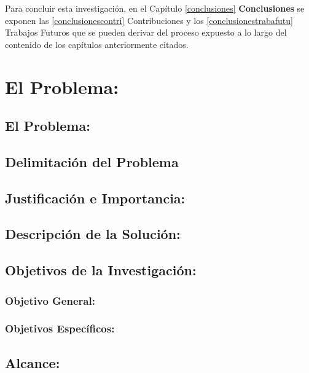 \documentclass[
  10,
  openany]{book}
\begin{document}
Para concluir esta investigación, en el Capítulo \ref{conclusiones} \textbf{Conclusiones} se exponen las \ref{conclusionescontri} Contribuciones y los \ref{conclusionestrabafutu} Trabajos Futuros que se pueden derivar del proceso expuesto a lo largo del contenido de los capítulos anteriormente citados.

\hypertarget{capproblema}{%
\chapter{El Problema:}\label{capproblema}}

\hypertarget{problema}{%
\section{El Problema:}\label{problema}}

\hypertarget{delimitacion}{%
\section{Delimitación del Problema}\label{delimitacion}}

\hypertarget{justificacion}{%
\section{Justificación e Importancia:}\label{justificacion}}

\hypertarget{descripcion}{%
\section{Descripción de la Solución:}\label{descripcion}}

\hypertarget{obje}{%
\section{Objetivos de la Investigación:}\label{obje}}

\hypertarget{objegeneral}{%
\subsection{Objetivo General:}\label{objegeneral}}

\hypertarget{objeespe}{%
\subsection{Objetivos Específicos:}\label{objeespe}}

\hypertarget{alcance}{%
\section{Alcance:}\label{alcance}}
\end{document}
